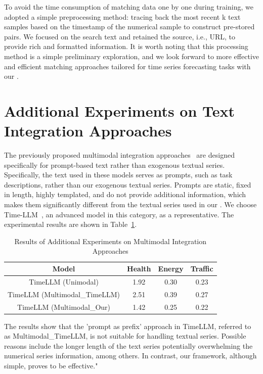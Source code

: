 To avoid the time consumption of matching data one by one during training, we adopted a simple preprocessing method: tracing back the most recent k text samples based on the timestamp of the numerical sample to construct pre-stored pairs. We focused on the search text and retained the source, i.e., URL, to provide rich and formatted information. It is worth noting that this processing method is a simple preliminary exploration, and we look forward to more effective and efficient matching approaches tailored for time series forecasting tasks with our \model.
\section{Additional Experiments on Text Integration Approaches}\label{app:texti_inte}
The previously proposed multimodal integration approaches~\cite{jin2023time,cao2023tempo} are designed specifically for prompt-based text rather than exogenous textual series. Specifically, the text used in these models serves as prompts, such as task descriptions, rather than our exogenous textual series. Prompts are static, fixed in length, highly templated, and do not provide additional information, which makes them significantly different from the textual series used in our \model. We choose Time-LLM~\cite{jin2023time}, an advanced model in this category, as a representative. The experimental results are shown in Table~\ref{tab:MI}.
\begin{table}[h]
\centering
\begin{tabular}{cccc} 
\hline
\textbf{Model}          & \textbf{Health} & \textbf{Energy} & \textbf{Traffic}  \\ 
\hline
TimeLLM (Unimodal)            & 1.92            & 0.30            & 0.23              \\ 
TimeLLM (Multimodal\_TimeLLM) & 2.51            & 0.39            & 0.27              \\ 
TimeLLM (Multimodal\_Our)     & 1.42            & 0.25            & 0.22              \\
\hline
\end{tabular}
\caption{Results of Additional Experiments on Multimodal Integration Approaches\label{tab:MI}}

\end{table}


The results show that the 'prompt as prefix' approach in TimeLLM, referred to as Multimodal\_TimeLLM, is not suitable for handling textual series. Possible reasons include the longer length of the text series potentially overwhelming the numerical series information, among others. In contrast, our framework, although simple, proves to be effective."

